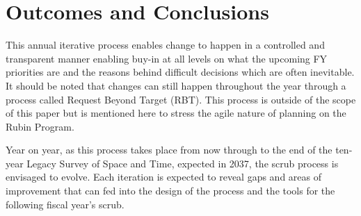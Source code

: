 \section{Outcomes and Conclusions} \label{sec:outcomes}

This annual iterative process enables change to happen in a controlled and transparent manner enabling buy-in at all levels on what the upcoming FY priorities are and the reasons behind difficult decisions which are often inevitable. It should be noted that changes can still happen throughout the year through a process called Request Beyond Target (RBT). This process is outside of the scope of this paper but is mentioned here to stress the agile nature of planning on the Rubin Program.

Year on year, as this process takes place from now through to the end of the ten-year Legacy Survey of Space and Time, expected in 2037, the scrub process is envisaged to evolve. Each iteration is expected to reveal gaps and areas of improvement that can fed into the design of the process and the tools for the following fiscal year’s scrub.
